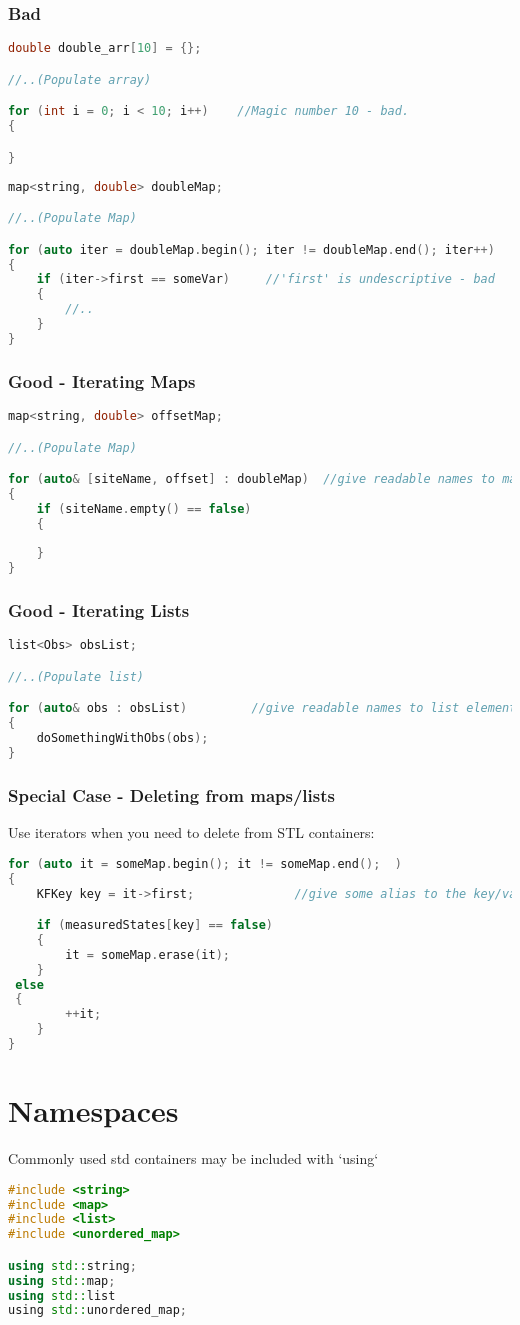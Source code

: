 \subsubsection{Bad}
\begin{lstlisting}[language=c++]
double double_arr[10] = {};

//..(Populate array)

for (int i = 0; i < 10; i++)    //Magic number 10 - bad.
{

}
\end{lstlisting}
%
\begin{lstlisting}[language=c++]
map<string, double> doubleMap;

//..(Populate Map)

for (auto iter = doubleMap.begin(); iter != doubleMap.end(); iter++)   //long, undescriptive - bad
{
   	if (iter->first == someVar)     //'first' is undescriptive - bad
   	{
   		//..
   	}
}
\end{lstlisting}
\subsubsection{Good - Iterating Maps}
\begin{lstlisting}[language=c++]
map<string, double> offsetMap;

//..(Populate Map)

for (auto& [siteName, offset] : doubleMap)	//give readable names to map keys and values
{
    if (siteName.empty() == false)
    {
    
    }
}
\end{lstlisting}
\subsubsection{Good - Iterating Lists}
\begin{lstlisting}[language=c++]
list<Obs> obsList;

//..(Populate list)

for (auto& obs : obsList)         //give readable names to list elements
{
    doSomethingWithObs(obs);
}
\end{lstlisting}

\subsubsection{Special Case - Deleting from maps/lists}

Use iterators when you need to delete from STL containers:
\begin{lstlisting}[language=c++]
for (auto it = someMap.begin(); it != someMap.end();  )
{
    KFKey key = it->first;				//give some alias to the key/value so they're readable

    if (measuredStates[key] == false)
    {
    	it = someMap.erase(it);
   	}
 else
 {
    	++it;
   	}
}
\end{lstlisting}
\section{Namespaces}

Commonly used std containers may be included with `using`
\begin{lstlisting}[language=c++]
#include <string>
#include <map>
#include <list>
#include <unordered_map>

using std::string;
using std::map;
using std::list
using std::unordered_map;
\end{lstlisting}
